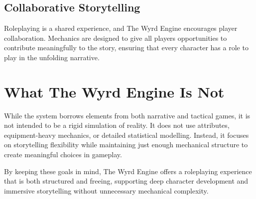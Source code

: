 
\subsection{Collaborative Storytelling}
Roleplaying is a shared experience, and The Wyrd Engine encourages player collaboration. Mechanics are designed to give all players opportunities to contribute meaningfully to the story, ensuring that every character has a role to play in the unfolding narrative.

\section{What The Wyrd Engine Is Not}
While the system borrows elements from both narrative and tactical games, it is not intended to be a rigid simulation of reality. It does not use attributes, equipment-heavy mechanics, or detailed statistical modelling. Instead, it focuses on storytelling flexibility while maintaining just enough mechanical structure to create meaningful choices in gameplay.

By keeping these goals in mind, The Wyrd Engine offers a roleplaying experience that is both structured and freeing, supporting deep character development and immersive storytelling without unnecessary mechanical complexity.

